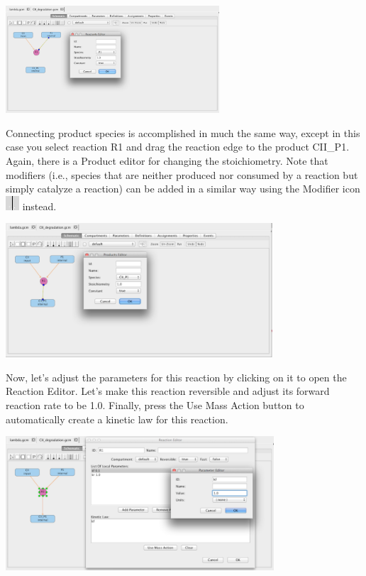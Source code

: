 \documentclass[titlepage,11pt]{article}
\begin{document}
\begin{center}
\includegraphics[height=40mm]{screenshots/reactant}
\end{center}

Connecting product species is accomplished in much the same way, except in this case you select reaction R1 and drag the reaction edge to the product CII\_P1.  Again, there is a Product editor for changing the stoichiometry.  Note that modifiers (i.e., species that are neither produced nor consumed by a reaction but simply catalyze a reaction) can be added in a similar way using the Modifier icon \includegraphics{../gui/icons/modelview/modifier_selected} instead.

\begin{center}
\includegraphics[height=50mm]{screenshots/product}
\end{center}

Now, let's adjust the parameters for this reaction by clicking on it to open the Reaction Editor.  Let's make this reaction reversible and adjust its forward reaction rate to be 1.0.  Finally, press the Use Mass Action button to automatically create a kinetic law for this reaction.

\begin{center}
\includegraphics[height=50mm]{screenshots/localParam}
\end{center}
\end{document}
